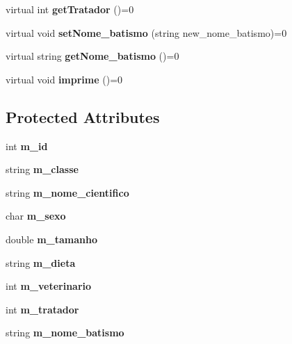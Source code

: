 \begin{DoxyCompactItemize}
\mbox{\label{class_animal_a1a23abf8d711966d7a5fee8d252553a8}} 
virtual int {\bfseries get\+Tratador} ()=0
\item 
\mbox{\label{class_animal_a3c5831947092f79287ae2001aaa62248}} 
virtual void {\bfseries set\+Nome\+\_\+batismo} (string new\+\_\+nome\+\_\+batismo)=0
\item 
\mbox{\label{class_animal_a579eb1c2aa4742ace88604b87f4480e9}} 
virtual string {\bfseries get\+Nome\+\_\+batismo} ()=0
\item 
\mbox{\label{class_animal_a12f6a03018bcb21e76fd29bcd0228db9}} 
virtual void {\bfseries imprime} ()=0
\end{DoxyCompactItemize}
\subsection*{Protected Attributes}
\begin{DoxyCompactItemize}
\item 
\mbox{\label{class_animal_a1a39448480e098fc74b5b67c4921a5ec}} 
int {\bfseries m\+\_\+id}
\item 
\mbox{\label{class_animal_a46c2a87591d201f67a6ddd0db794cc44}} 
string {\bfseries m\+\_\+classe}
\item 
\mbox{\label{class_animal_a387539564900b1fb8580f7cd0c7a3a11}} 
string {\bfseries m\+\_\+nome\+\_\+cientifico}
\item 
\mbox{\label{class_animal_aaa6d77e661ed0fa9a33500588c8acfef}} 
char {\bfseries m\+\_\+sexo}
\item 
\mbox{\label{class_animal_afe83ba40e79b42d06b0c95f61aaa0218}} 
double {\bfseries m\+\_\+tamanho}
\item 
\mbox{\label{class_animal_a6bcc4913ef54988ddc4e938c6033ff35}} 
string {\bfseries m\+\_\+dieta}
\item 
\mbox{\label{class_animal_a1a853347637c7bd3df1bea4732873ffd}} 
int {\bfseries m\+\_\+veterinario}
\item 
\mbox{\label{class_animal_a11c903a421cd727890622bb50383e886}} 
int {\bfseries m\+\_\+tratador}
\item 
\mbox{\label{class_animal_a3addde93c38579b4c63612dbf7ea3631}} 
string {\bfseries m\+\_\+nome\+\_\+batismo}
\end{DoxyCompactItemize}
